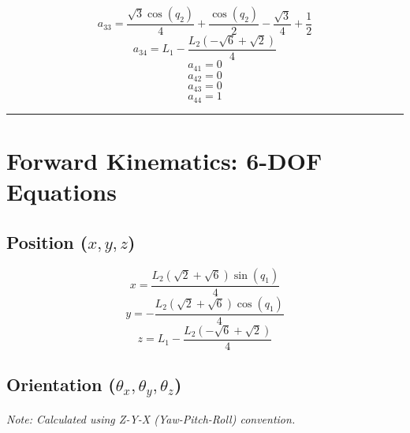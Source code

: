 \documentclass[11pt, a4paper]{article}
\begin{document}
\begin{dmath*}
a_{33} = \frac{\sqrt{3} \cos{\left(q_{2} \right)}}{4} + \frac{\cos{\left(q_{2} \right)}}{2} - \frac{\sqrt{3}}{4} + \frac{1}{2}\end{dmath*}
\begin{dmath*}
a_{34} = L_{1} - \frac{L_{2} \left(- \sqrt{6} + \sqrt{2}\right)}{4}\end{dmath*}
\begin{dmath*}
a_{41} = 0\end{dmath*}
\begin{dmath*}
a_{42} = 0\end{dmath*}
\begin{dmath*}
a_{43} = 0\end{dmath*}
\begin{dmath*}
a_{44} = 1\end{dmath*}
\hrule

\section*{Forward Kinematics: 6-DOF Equations}
\subsection*{Position ($x, y, z$)}
\vspace{0.5cm}
$$ x = \frac{L_{2} \left(\sqrt{2} + \sqrt{6}\right) \sin{\left(q_{1} \right)}}{4} $$
$$ y = - \frac{L_{2} \left(\sqrt{2} + \sqrt{6}\right) \cos{\left(q_{1} \right)}}{4} $$
$$ z = L_{1} - \frac{L_{2} \left(- \sqrt{6} + \sqrt{2}\right)}{4} $$
\subsection*{Orientation ($\theta_x, \theta_y, \theta_z$)}
\textit{Note: Calculated using Z-Y-X (Yaw-Pitch-Roll) convention.}
\end{document}
